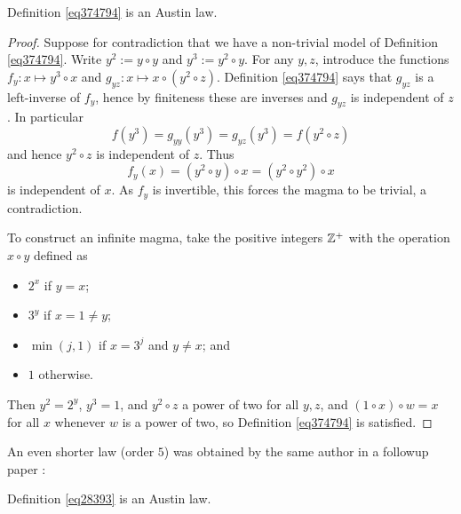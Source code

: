 \begin{theorem}
  \leanok
  \label{kis-thm}
  Definition \ref{eq374794} is an Austin law.
\end{theorem}

\begin{proof} \leanok Suppose for contradiction that we have a non-trivial model of Definition \ref{eq374794}. Write $y^2 := y \circ y$ and $y^3 := y^2 \circ y$. For any $y,z$, introduce the functions $f_y: x \mapsto y^3 \circ x$ and $g_{yz}: x \mapsto x \circ (y^2 \circ z)$.  Definition \ref{eq374794} says that $g_{yz}$ is a left-inverse of $f_y$, hence by finiteness these are inverses and $g_{yz}$ is independent of $z$. In particular
$$ f(y^3) = g_{yy}(y^3) = g_{yz}(y^3) = f(y^2 \circ z)$$
and hence $y^2 \circ z$ is independent of $z$.  Thus
$$ f_y(x) = (y^2 \circ y) \circ x = (y^2 \circ y^2) \circ x$$
is independent of $x$.  As $f_y$ is invertible, this forces the magma to be trivial, a contradiction.

To construct an infinite magma, take the positive integers $\mathbb{Z}^+$ with the operation $x \circ y$ defined as
\begin{itemize}
  \item $2^x$ if $y=x$;
  \item $3^y$ if $x = 1 \neq y$;
  \item $\min(j,1)$ if $x=3^j$ and $y \neq x$; and
  \item $1$ otherwise.
\end{itemize}
Then $y^2 = 2^y$, $y^3 = 1$, and $y^2 \circ z$ a power of two for all $y, z$, and $(1 \circ x) \circ w = x$ for all $x$ whenever $w$ is a power of two, so Definition \ref{eq374794} is satisfied.
\end{proof}

An even shorter law (order $5$) was obtained by the same author in a followup paper \cite{Kisielewicz2}:

\begin{theorem}\label{kis-thm2} Definition \ref{eq28393} is an Austin law.
\end{theorem}

